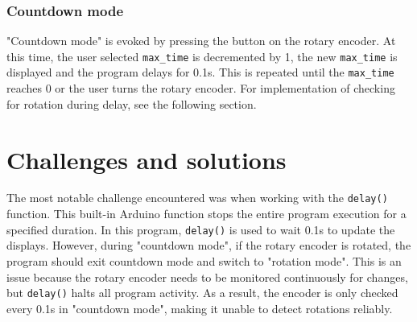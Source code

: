 \documentclass[fleqn]{article}
\begin{document}
\subsubsection*{Countdown mode}
"Countdown mode" is evoked by pressing the button on the rotary encoder. At this time, the user selected \verb|max_time| is decremented by 1, the new \verb|max_time| is displayed and the program delays for 0.1s. This is repeated until the \verb|max_time| reaches 0 or the user turns the rotary encoder. For implementation of checking for rotation during delay, see the following section. 




\section*{Challenges and solutions}
The most notable challenge encountered was when working with the \verb|delay()| function. This built-in Arduino function stops the entire program execution for a specified duration. In this program, \verb|delay()| is used to wait 0.1s to update the displays. However, during "countdown mode", if the rotary encoder is rotated, the program should exit countdown mode and switch to "rotation mode". This is an issue because the rotary encoder needs to be monitored continuously for changes, but \verb|delay()| halts all program activity. As a result, the encoder is only checked every 0.1s in "countdown mode", making it unable to detect rotations reliably. 
\end{document}
